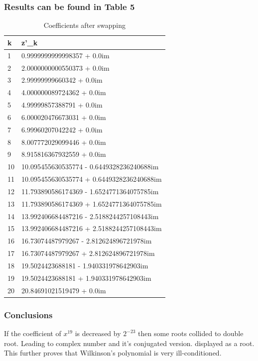 \documentclass[11pt]{article}
\begin{document}
\subsubsection{Results can be found in \textbf{Table 5}}
\begin{table}[!ht]
    \centering
    \caption{Coefficients after swapping}
    \begin{tabular}{|l|l|}
    \hline
        k & z'\_k \\ \hline
        1 & 0.9999999999998357 + 0.0im \\ \hline
        2 & 2.0000000000550373 + 0.0im \\ \hline
        3 & 2.99999999660342 + 0.0im \\ \hline
        4 & 4.000000089724362 + 0.0im \\ \hline
        5 & 4.99999857388791 + 0.0im \\ \hline
        6 & 6.000020476673031 + 0.0im \\ \hline
        7 & 6.99960207042242 + 0.0im \\ \hline
        8 & 8.007772029099446 + 0.0im \\ \hline
        9 & 8.915816367932559 + 0.0im \\ \hline
        10 & 10.095455630535774 - 0.6449328236240688im \\ \hline
        11 & 10.095455630535774 + 0.6449328236240688im \\ \hline
        12 & 11.793890586174369 - 1.6524771364075785im \\ \hline
        13 & 11.793890586174369 + 1.6524771364075785im \\ \hline
        14 & 13.992406684487216 - 2.5188244257108443im \\ \hline
        15 & 13.992406684487216 + 2.5188244257108443im \\ \hline
        16 & 16.73074487979267 - 2.812624896721978im \\ \hline
        17 & 16.73074487979267 + 2.812624896721978im \\ \hline
        18 & 19.5024423688181 - 1.940331978642903im \\ \hline
        19 & 19.5024423688181 + 1.940331978642903im \\ \hline
        20 & 20.84691021519479 + 0.0im \\ \hline
    \end{tabular}
\end{table}
\subsubsection{Conclusions}
If the coefficient of $x^{19}$ is decreased by $2^{-23}$ then some roots collided to double root. Leading to complex number and it's conjugated version. displayed as a root.
This further proves that Wilkinson's polynomial is very ill-conditioned.  
\end{document}
